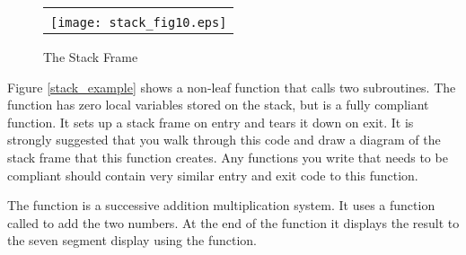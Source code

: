 
\begin{figure}[!hbtp]
\begin{footnotesize}
\begin{center}
\begin{tabular}{|p{8cm}|}
\hline
\\
\texttt{[image: stack\_fig10.eps]}

\\
\hline
\end{tabular}
\end{center}
\end{footnotesize}

\caption{The Stack Frame}
\label{stackframe}
\end{figure}


Figure \ref{stack_example} shows a non-leaf function that calls two
subroutines. The function has zero local variables stored on the
stack, but is a fully compliant function. It sets up a stack frame on
entry and tears it down on exit. It is strongly suggested that you
walk through this code and draw a diagram of the stack frame that this
function creates. Any functions you write that needs to be compliant
should contain very similar entry and exit code to this function.

The function is a successive addition multiplication system. It uses a
function called  to add the two numbers. At the end of the
function it displays the result to the seven segment display using the
 function.





